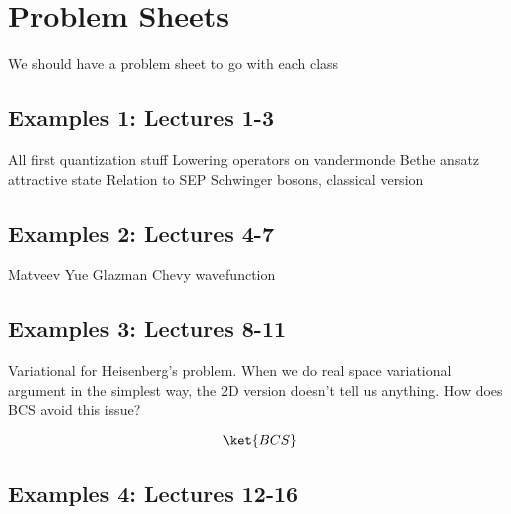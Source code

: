 \section{Problem Sheets}


We should have a problem sheet to go with each class

\subsection{Examples 1: Lectures 1-3}

All first quantization stuff
Lowering operators on vandermonde
Bethe ansatz attractive state
Relation to SEP
Schwinger bosons, classical version

\subsection{Examples 2: Lectures 4-7}

Matveev Yue Glazman
Chevy wavefunction

\subsection{Examples 3: Lectures 8-11}

Variational for Heisenberg's problem. When we do real space variational argument in the simplest way, the 2D version doesn't tell us anything. How does BCS avoid this issue?

\[\ket{BCS}\]

\subsection{Examples 4: Lectures 12-16}



